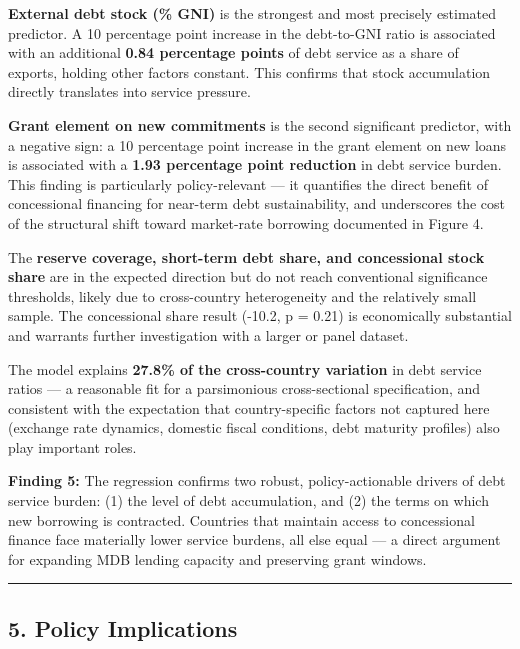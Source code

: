 \documentclass[
  letterpaper,
  DIV=11,
  numbers=noendperiod]{scrartcl}
\begin{document}
\textbf{External debt stock (\% GNI)} is the strongest and most
precisely estimated predictor. A 10 percentage point increase in the
debt-to-GNI ratio is associated with an additional \textbf{0.84
percentage points} of debt service as a share of exports, holding other
factors constant. This confirms that stock accumulation directly
translates into service pressure.

\textbf{Grant element on new commitments} is the second significant
predictor, with a negative sign: a 10 percentage point increase in the
grant element on new loans is associated with a \textbf{1.93 percentage
point reduction} in debt service burden. This finding is particularly
policy-relevant --- it quantifies the direct benefit of concessional
financing for near-term debt sustainability, and underscores the cost of
the structural shift toward market-rate borrowing documented in Figure
4.

The \textbf{reserve coverage, short-term debt share, and concessional
stock share} are in the expected direction but do not reach conventional
significance thresholds, likely due to cross-country heterogeneity and
the relatively small sample. The concessional share result (-10.2, p =
0.21) is economically substantial and warrants further investigation
with a larger or panel dataset.

The model explains \textbf{27.8\% of the cross-country variation} in
debt service ratios --- a reasonable fit for a parsimonious
cross-sectional specification, and consistent with the expectation that
country-specific factors not captured here (exchange rate dynamics,
domestic fiscal conditions, debt maturity profiles) also play important
roles.

\textbf{Finding 5:} The regression confirms two robust,
policy-actionable drivers of debt service burden: (1) the level of debt
accumulation, and (2) the terms on which new borrowing is contracted.
Countries that maintain access to concessional finance face materially
lower service burdens, all else equal --- a direct argument for
expanding MDB lending capacity and preserving grant windows.

\begin{center}\rule{0.5\linewidth}{0.5pt}\end{center}

\subsection{5. Policy Implications}\label{policy-implications}
\end{document}
